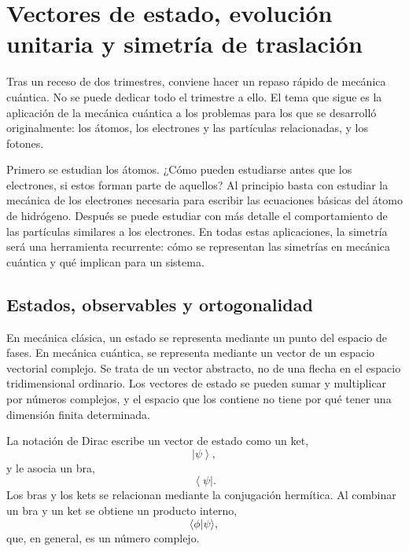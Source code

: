 \chapter{Vectores de estado, evolución unitaria y simetría de traslación}
\providecommand{\ket}[1]{\left\lvert#1\right\rangle}
\providecommand{\bra}[1]{\left\langle#1\right\rvert}

Tras un receso de dos trimestres, conviene hacer un repaso rápido de mecánica cuántica. No se puede dedicar todo el trimestre a ello. El tema que sigue es la aplicación de la mecánica cuántica a los problemas para los que se desarrolló originalmente: los átomos, los electrones y las partículas relacionadas, y los fotones.

Primero se estudian los átomos. ¿Cómo pueden estudiarse antes que los electrones, si estos forman parte de aquellos? Al principio basta con estudiar la mecánica de los electrones necesaria para escribir las ecuaciones básicas del átomo de hidrógeno. Después se puede estudiar con más detalle el comportamiento de las partículas similares a los electrones. En todas estas aplicaciones, la simetría será una herramienta recurrente: cómo se representan las simetrías en mecánica cuántica y qué implican para un sistema.

\section{Estados, observables y ortogonalidad}

En mecánica clásica, un estado se representa mediante un punto del espacio de fases. En mecánica cuántica, se representa mediante un vector de un espacio vectorial complejo. Se trata de un vector abstracto, no de una flecha en el espacio tridimensional ordinario. Los vectores de estado se pueden sumar y multiplicar por números complejos, y el espacio que los contiene no tiene por qué tener una dimensión finita determinada.

La notación de Dirac escribe un vector de estado como un ket,
\begin{equation}
\ket{\psi},
\end{equation}
y le asocia un bra,
\begin{equation}
\bra{\psi}.
\end{equation}
Los bras y los kets se relacionan mediante la conjugación hermítica. Al combinar un bra y un ket se obtiene un producto interno,
\begin{equation}
\langle\phi|\psi\rangle,
\end{equation}
que, en general, es un número complejo.

